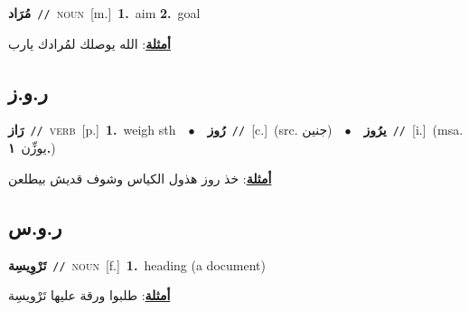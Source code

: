 \documentclass[10pt,a4paper,twoside]{article} %
\begin{document}
\begin{multicols}{2}
{\setlength\topsep{0pt}\textbf{\foreignlanguage{arabic}{مُرَاد}}\ {\color{gray}\texttt{//}\color{black}}\ \textsc{noun}\ [m.]\ \textbf{1.}~aim  \textbf{2.}~goal\  \begin{flushright}\color{gray}\foreignlanguage{arabic}{\textbf{\underline{\foreignlanguage{arabic}{أمثلة}}}: الله يوصلك لمُرادك يارب}\end{flushright}\color{black}} \vspace{2mm}

\vspace{-3mm}
\subsection*{\color{blue}\foreignlanguage{arabic}{ر.و.ز}\color{blue}{}} 

{\setlength\topsep{0pt}\textbf{\foreignlanguage{arabic}{رَاز}}\ {\color{gray}\texttt{//}\color{black}}\ \textsc{verb}\ [p.]\ \textbf{1.}~weigh sth\ \ $\bullet$\ \ \setlength\topsep{0pt}\textbf{\foreignlanguage{arabic}{رُوز}}\ {\color{gray}\texttt{//}\color{black}}\ [c.]\ (src. \color{gray}\foreignlanguage{arabic}{جنين}\color{black})\ \ $\bullet$\ \ \setlength\topsep{0pt}\textbf{\foreignlanguage{arabic}{يرُوز}}\ {\color{gray}\texttt{//}\color{black}}\ [i.]\ \color{gray}(msa. \foreignlanguage{arabic}{يوزِّن}~\foreignlanguage{arabic}{\textbf{١.}})\color{black}\  \begin{flushright}\color{gray}\foreignlanguage{arabic}{\textbf{\underline{\foreignlanguage{arabic}{أمثلة}}}: خذ روز هذول الكياس وشوف قديش بيطلعن}\end{flushright}\color{black}} \vspace{2mm}

\vspace{-3mm}
\subsection*{\color{blue}\foreignlanguage{arabic}{ر.و.س}\color{blue}{}} 

{\setlength\topsep{0pt}\textbf{\foreignlanguage{arabic}{تَرْوِيسِة}}\ {\color{gray}\texttt{//}\color{black}}\ \textsc{noun}\ [f.]\ \textbf{1.}~heading (a document)\  \begin{flushright}\color{gray}\foreignlanguage{arabic}{\textbf{\underline{\foreignlanguage{arabic}{أمثلة}}}: طلبوا ورقة عليها تَرْويسِة}\end{flushright}\color{black}} \vspace{2mm}


\end{multicols}
\end{document}
